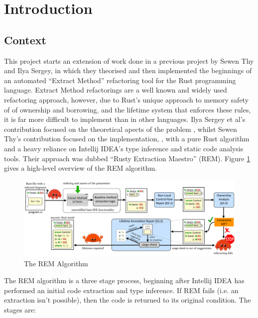 \section{Introduction}

\subsection*{Context}

This project starts an extension of work done in a previous project by Sewen Thy and
Ilya Sergey, in which they theorised and then implemented the beginnings of an
automated ``Extract Method'' refactoring tool for the Rust programming language.
Extract Method refactorings are a well known and widely used refactoring
approach, however, due to Rust's unique approach to memory safety of of
ownership and borrowing, and the lifetime system that enforces these rules, it
is far more difficult to implement than in other languages. Ilya Sergey et al's
contribution focused on the theoretical apects of the problem
\cite{AdventureOfALifetime}, whilst Sewen Thy's contribution focused on the
implementation, \cite{BorrowingWithoutSorrowing}, with a pure Rust algorithm and
a heavy reliance on Intellij IDEA's type inference and static code analysis
tools. Their approach was dubbed ``Rusty Extraction Maestro'' (REM). Figure
\ref{fig:rem-overview} \cite{AdventureOfALifetime} gives a high-level overview
of the REM algorithm.

\begin{figure}[h]
    \centering
    \includegraphics[width=\columnwidth]{Figures/rem-overview.png}
    \caption{The REM Algorithm}
    \label{fig:rem-overview}
\end{figure}

The REM algorithm is a three stage process, beginning after Intellij IDEA has
performed an initial code extraction and type inference. If REM fails (i.e. an
extraction isn't possible), then the code is returned to its original condition.
The stages are:

